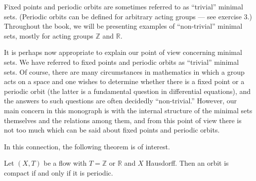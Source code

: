 Fixed points and periodic orbits are sometimes referred to as “trivial” minimal sets. (Periodic orbits can be defined for arbitrary acting groups — see exercise 3.) Throughout the book, we will be presenting examples of “non-trivial” minimal sets, mostly for acting groups $\mathbb{Z}$ and $\mathbb{R}$.

It is perhaps now appropriate to explain our point of view concerning minimal sets. We have referred to fixed points and periodic orbits as “trivial” minimal sets. Of course, there are many circumstances in mathematics in which a group acts on a space and one wishes to determine whether there is a fixed point or a periodic orbit (the latter is a fundamental question in differential equations), and the answers to such questions are often decidedly “non-trivial.” However, our main concern in this monograph is with the internal structure of the minimal sets themselves and the relations among them, and from this point of view there is not too much which can be said about fixed points and periodic orbits.

In this connection, the following theorem is of interest.


\begin{theorem*}[5]
    Let $(X,T)$ be a flow with $T = \mathbb{Z}$ or $\mathbb{R}$ and $X$ Hausdorff. Then an orbit is compact if and only if it is periodic.
\end{theorem*}

